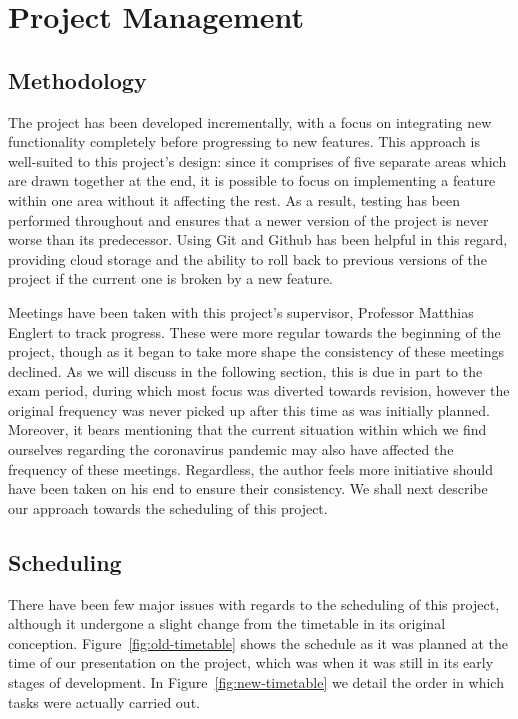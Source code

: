 \section{Project Management}

\label{sec:projectManagement}

\subsection{Methodology}

The project has been developed incrementally, with a focus on integrating new
functionality completely before progressing to new features. This approach is
well-suited to this project's design: since it comprises of five separate areas
which are drawn together at the end, it is possible to focus on implementing a
feature within one area without it affecting the rest. As a result, testing has
been performed throughout and ensures that a newer version of the project is
never worse than its predecessor. Using Git and Github has been helpful in this
regard, providing cloud storage and the ability to roll back to previous
versions of the project if the current one is broken by a new feature.

Meetings have been taken with this project's supervisor, Professor Matthias
Englert to track progress. These were more regular towards the beginning of the
project, though as it began to take more shape the consistency of these
meetings declined. As we will discuss in the following section, this is due in
part to the exam period, during which most focus was diverted towards revision,
however the original frequency was never picked up after this time as was
initially planned. Moreover, it bears mentioning that the current situation
within which we find ourselves regarding the coronavirus pandemic may also have
affected the frequency of these meetings. Regardless, the author feels more
initiative should have been taken on his end to ensure their consistency. We
shall next describe our approach towards the scheduling of this project.

\subsection{Scheduling}

There have been few major issues with regards to the scheduling of this
project, although it undergone a slight change from the timetable in its
original conception. Figure~\ref{fig:old-timetable} shows the schedule as it
was planned at the time of our presentation on the project, which was when it
was still in its early stages of development. In Figure~\ref{fig:new-timetable}
we detail the order in which tasks were actually carried out.

